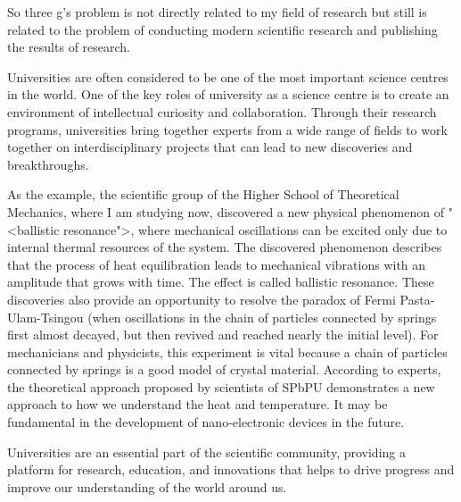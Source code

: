 \documentclass[main.tex]{subfiles}
\begin{document}
So three g's problem is not directly related to my field of research but still is related to the problem of conducting modern scientific research and publishing the results of research.
\\


\newpage


\setcounter{subsection}{4}

Universities are often considered to be one of the most important science centres in the world.
One of the key roles of university as a science centre is to create an environment of intellectual curiosity and collaboration.
Through their research programs, universities bring together experts from a wide range of fields to work together on interdisciplinary projects that can lead to new discoveries and breakthroughs.

As the example, the scientific group of the Higher School of Theoretical Mechanics, where I am studying now, discovered a new physical phenomenon of "<ballistic resonance">, where mechanical oscillations can be excited only due to internal thermal resources of the system.
The discovered phenomenon describes that the process of heat equilibration leads to mechanical vibrations with an amplitude that grows with time.
The effect is called ballistic resonance.
These discoveries also provide an opportunity to resolve the paradox of Fermi Pasta-Ulam-Tsingou (when oscillations in the chain of particles connected by springs first almost decayed, but then revived and reached nearly the initial level).
For mechanicians and physicists, this experiment is vital because a chain of particles connected by springs is a good model of crystal material.
According to experts, the theoretical approach proposed by scientists of SPbPU demonstrates a new approach to how we understand the heat and temperature.
It may be fundamental in the development of nano-electronic devices in the future.

Universities are an essential part of the scientific community, providing a platform for research, education, and innovations that helps to drive progress and improve our understanding of the world around us.
\\


\newpage
\end{document}
